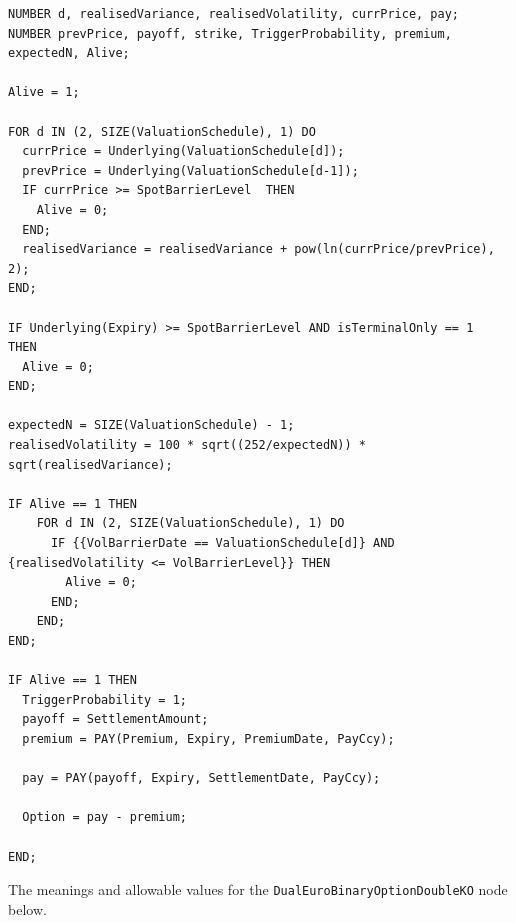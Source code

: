 \begin{listing}[hbt]
\begin{verbatim}
NUMBER d, realisedVariance, realisedVolatility, currPrice, pay;
NUMBER prevPrice, payoff, strike, TriggerProbability, premium, expectedN, Alive;

Alive = 1;

FOR d IN (2, SIZE(ValuationSchedule), 1) DO
  currPrice = Underlying(ValuationSchedule[d]);
  prevPrice = Underlying(ValuationSchedule[d-1]);
  IF currPrice >= SpotBarrierLevel  THEN
    Alive = 0;
  END;
  realisedVariance = realisedVariance + pow(ln(currPrice/prevPrice), 2);
END;

IF Underlying(Expiry) >= SpotBarrierLevel AND isTerminalOnly == 1  THEN
  Alive = 0;
END;

expectedN = SIZE(ValuationSchedule) - 1;
realisedVolatility = 100 * sqrt((252/expectedN)) * sqrt(realisedVariance);

IF Alive == 1 THEN
    FOR d IN (2, SIZE(ValuationSchedule), 1) DO
      IF {{VolBarrierDate == ValuationSchedule[d]} AND {realisedVolatility <= VolBarrierLevel}} THEN
        Alive = 0;
      END;
    END;
END;

IF Alive == 1 THEN
  TriggerProbability = 1;
  payoff = SettlementAmount;
  premium = PAY(Premium, Expiry, PremiumDate, PayCcy);

  pay = PAY(payoff, Expiry, SettlementDate, PayCcy);

  Option = pay - premium;

END;
\end{verbatim}
\caption{Payoff script for a DualEuroBinaryOptionDoubleKO.}
\label{lst:DualEuroBinaryOptionDoubleKO}
\end{listing}

The meanings and allowable values for the \lstinline!DualEuroBinaryOptionDoubleKO! node below.

